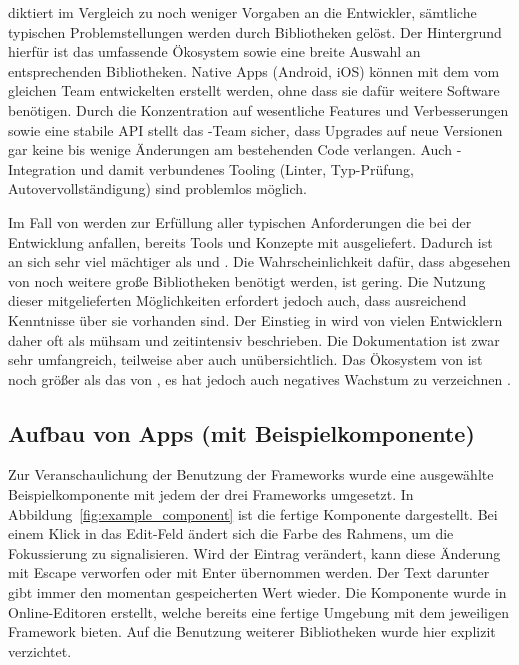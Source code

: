  diktiert im Vergleich zu  noch weniger Vorgaben an die Entwickler, sämtliche typischen Problemstellungen werden durch Bibliotheken gelöst. Der Hintergrund hierfür ist das umfassende Ökosystem sowie eine breite Auswahl an entsprechenden Bibliotheken. Native Apps (Android, iOS) können mit dem vom gleichen Team entwickelten  erstellt werden, ohne dass sie dafür weitere Software benötigen. Durch die Konzentration auf wesentliche Features und Verbesserungen sowie eine stabile API stellt das -Team sicher, dass Upgrades auf neue Versionen gar keine bis wenige Änderungen am bestehenden Code verlangen. Auch -Integration und damit verbundenes Tooling (Linter, Typ-Prüfung, Autovervollständigung) sind problemlos möglich.

Im Fall von  werden zur Erfüllung aller typischen Anforderungen die bei der Entwicklung anfallen, bereits Tools und Konzepte mit ausgeliefert. Dadurch ist  an sich sehr viel mächtiger als  und . Die Wahrscheinlichkeit dafür, dass abgesehen von  noch weitere große Bibliotheken benötigt werden, ist gering. Die Nutzung dieser mitgelieferten Möglichkeiten erfordert jedoch auch, dass ausreichend Kenntnisse über sie vorhanden sind. Der Einstieg in  wird von vielen Entwicklern  daher oft als mühsam und zeitintensiv beschrieben. Die Dokumentation ist zwar sehr umfangreich, teilweise aber auch unübersichtlich. Das Ökosystem von  ist noch größer als das von , es hat jedoch auch negatives Wachstum zu verzeichnen \parencite[vgl.][]{npmjs_2018}.

\subsection{Aufbau von Apps (mit Beispielkomponente)}
Zur Veranschaulichung der Benutzung der Frameworks wurde eine ausgewählte Beispielkomponente mit jedem der drei Frameworks umgesetzt. In Abbildung~\ref{fig:example_component} ist die fertige Komponente dargestellt. Bei einem Klick in das Edit-Feld ändert sich die Farbe des Rahmens, um die Fokussierung zu signalisieren. Wird der Eintrag verändert, kann diese Änderung mit Escape verworfen oder mit Enter übernommen werden. Der Text darunter gibt immer den momentan gespeicherten Wert wieder. Die Komponente wurde in Online-Editoren erstellt, welche bereits eine fertige Umgebung mit dem jeweiligen Framework bieten. Auf die Benutzung weiterer Bibliotheken wurde hier explizit verzichtet.

